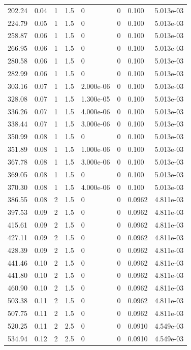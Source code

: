 \documentclass[preview]{standalone}
\begin{document}
{{\begin{tabular}{L{1.2cm}C{1.2cm} C{0.3cm}C{0.5cm} C{1.4cm}C{1.4cm} C{1.4cm}C{1.4cm}}
  202.24  &  0.04  & 1     & 1.5 &  0  & 0  & 0.100 &  5.013e-03   \\ 
  224.79  &  0.05  & 1     & 1.5 &  0  & 0  & 0.100 &  5.013e-03   \\ 
  258.87  &  0.06  & 1     & 1.5 &  0  & 0  & 0.100 &  5.013e-03   \\ 
  266.95  &  0.06  & 1     & 1.5 &  0  & 0  & 0.100 &  5.013e-03   \\ 
  280.58  &  0.06  & 1     & 1.5 &  0  & 0  & 0.100 &  5.013e-03   \\ 
  282.99  &  0.06  & 1     & 1.5 &  0  & 0  & 0.100 &  5.013e-03   \\ 
  303.16  &  0.07  & 1     & 1.5 &  2.000e-06  & 0  & 0.100 &  5.013e-03   \\ 
  328.08  &  0.07  & 1     & 1.5 &  1.300e-05  & 0  & 0.100 &  5.013e-03   \\ 
  336.26  &  0.07  & 1     & 1.5 &  4.000e-06  & 0  & 0.100 &  5.013e-03   \\ 
  338.44  &  0.07  & 1     & 1.5 &  3.000e-06  & 0  & 0.100 &  5.013e-03   \\ 
  350.99  &  0.08  & 1     & 1.5 &  0  & 0  & 0.100 &  5.013e-03   \\ 
  351.89  &  0.08  & 1     & 1.5 &  1.000e-06  & 0  & 0.100 &  5.013e-03   \\ 
  367.78  &  0.08  & 1     & 1.5 &  3.000e-06  & 0  & 0.100 &  5.013e-03   \\ 
  369.05  &  0.08  & 1     & 1.5 &  0  & 0  & 0.100 &  5.013e-03   \\ 
  370.30  &  0.08  & 1     & 1.5 &  4.000e-06  & 0  & 0.100 &  5.013e-03   \\ 
  386.55  &  0.08  & 2     & 1.5 &  0  & 0  & 0.0962 &  4.811e-03   \\ 
  397.53  &  0.09  & 2     & 1.5 &  0  & 0  & 0.0962 &  4.811e-03   \\ 
  415.61  &  0.09  & 2     & 1.5 &  0  & 0  & 0.0962 &  4.811e-03   \\ 
  427.11  &  0.09  & 2     & 1.5 &  0  & 0  & 0.0962 &  4.811e-03   \\ 
  428.39  &  0.09  & 2     & 1.5 &  0  & 0  & 0.0962 &  4.811e-03   \\ 
  441.46  &  0.10  & 2     & 1.5 &  0  & 0  & 0.0962 &  4.811e-03   \\ 
  441.80  &  0.10  & 2     & 1.5 &  0  & 0  & 0.0962 &  4.811e-03   \\ 
  460.90  &  0.10  & 2     & 1.5 &  0  & 0  & 0.0962 &  4.811e-03   \\ 
  503.38  &  0.11  & 2     & 1.5 &  0  & 0  & 0.0962 &  4.811e-03   \\ 
  507.75  &  0.11  & 2     & 1.5 &  0  & 0  & 0.0962 &  4.811e-03   \\ 
  520.25  &  0.11  & 2     & 2.5 &  0  & 0  & 0.0910 &  4.549e-03   \\ 
  534.94  &  0.12  & 2     & 2.5 &  0  & 0  & 0.0910 &  4.549e-03   \\ 
\hline 
\end{tabular} 

}}
\end{document}
